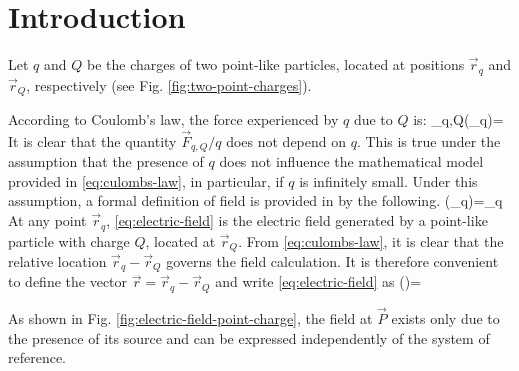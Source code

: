 \section{Introduction}
Let $q$ and $Q$ be the charges of two point-like particles, located at positions $\vec{r}_{q}$ and $\vec{r}_{Q}$, respectively
(see Fig. \ref{fig:two-point-charges}).

According to Coulomb's law, the force experienced by $q$ due to $Q$ is:
\be\label{eq:culombs-law}
_{q,Q}(_q)=
\ee
It is clear that the quantity $\vec{F}_{q,Q}/q$ does not depend on $q$. This is true under the assumption that the presence of $q$ does not influence the mathematical model provided in \ref{eq:culombs-law}, in particular, if $q$ is infinitely small. Under this assumption, a formal definition of field is provided in by the following.
\be\label{eq:electric-field}
(_{q})=\lim_{q } 
\ee
At any point $\vec{r}_{q}$, \ref{eq:electric-field} is the electric field generated by a point-like particle with charge $Q$, located at $\vec{r}_{Q}$. From \ref{eq:culombs-law}, it is clear that the relative location $\vec{r}_{q}-\vec{r}_{Q}$ governs the field calculation. It is therefore convenient to define the vector $\vec{r}=\vec{r}_{q}-\vec{r}_{Q}$ and write \ref{eq:electric-field} as 
\be\label{eq:electric-field-final}
()=
\ee

As shown in Fig. \ref{fig:electric-field-point-charge}, the field at $\vec{P}$ exists only due to the presence of its source and can be expressed independently of the system of reference.